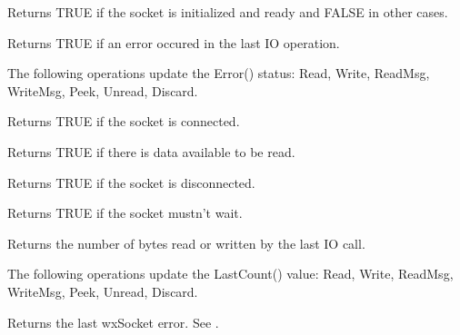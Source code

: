 % 
%

\label{wxsocketbaseok}


Returns TRUE if the socket is initialized and ready and FALSE in other
cases.

\label{wxsocketbaseerror}


Returns TRUE if an error occured in the last IO operation.

The following operations update the Error() status:
Read, Write, ReadMsg, WriteMsg, Peek, Unread, Discard.

\label{wxsocketbaseconnected}


Returns TRUE if the socket is connected.

\label{wxsocketbaseisdata}


Returns TRUE if there is data available to be read. 

\label{wxsocketbasedisconnected}


Returns TRUE if the socket is disconnected.

\label{wxsocketbasenowait}


Returns TRUE if the socket mustn't wait.

\label{wxsocketbaselastcount}


Returns the number of bytes read or written by the last IO call.

The following operations update the LastCount() value:
Read, Write, ReadMsg, WriteMsg, Peek, Unread, Discard.

\label{wxsocketbaselasterror}


Returns the last wxSocket error. See .

